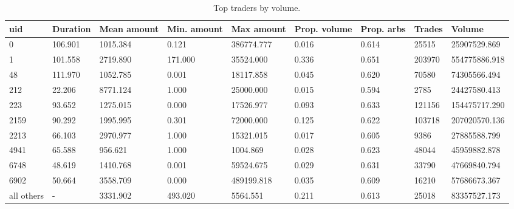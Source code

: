 \documentclass[]{scrartcl}
\begin{document}
	
	\begin{table}[]\scriptsize{
			\begin{tabular}{lllllllll}
				\toprule
				uid & Duration & Mean amount & Min. amount & Max amount & Prop. volume & Prop. arbs & Trades & Volume \\ \midrule
				0    & 106.901 & 1015.384 & 0.121   & 386774.777 & 0.016 & 0.614 & 25515  & 25907529.869  \\
				1    & 101.558 & 2719.890 & 171.000 & 35524.000  & 0.336 & 0.651 & 203970 & 554775886.918 \\
				48   & 111.970 & 1052.785 & 0.001   & 18117.858  & 0.045 & 0.620 & 70580  & 74305566.494  \\
				212  & 22.206  & 8771.124 & 1.000   & 25000.000  & 0.015 & 0.594 & 2785   & 24427580.413  \\
				223  & 93.652  & 1275.015 & 0.000   & 17526.977  & 0.093 & 0.633 & 121156 & 154475717.290 \\
				2159 & 90.292  & 1995.995 & 0.301   & 72000.000  & 0.125 & 0.622 & 103718 & 207020570.136 \\
				2213 & 66.103  & 2970.977 & 1.000   & 15321.015  & 0.017 & 0.605 & 9386   & 27885588.799  \\
				4941 & 65.588  & 956.621  & 1.000   & 1004.869   & 0.028 & 0.623 & 48044  & 45959882.878  \\
				6748 & 48.619  & 1410.768 & 0.001   & 59524.675  & 0.029 & 0.631 & 33790  & 47669840.794  \\
				6902 & 50.664  & 3558.709 & 0.000   & 489199.818 & 0.035 & 0.609 & 16210  & 57686673.367  \\
				all others &-     & 3331.902     & 493.020     & 5564.551    & 0.211                          & 0.613      & 25018 & 83357527.173\\ \bottomrule
			\end{tabular}
			\caption{Top traders by volume. \label{tab:tbv}}
		}
	\end{table}
	
\end{document}
